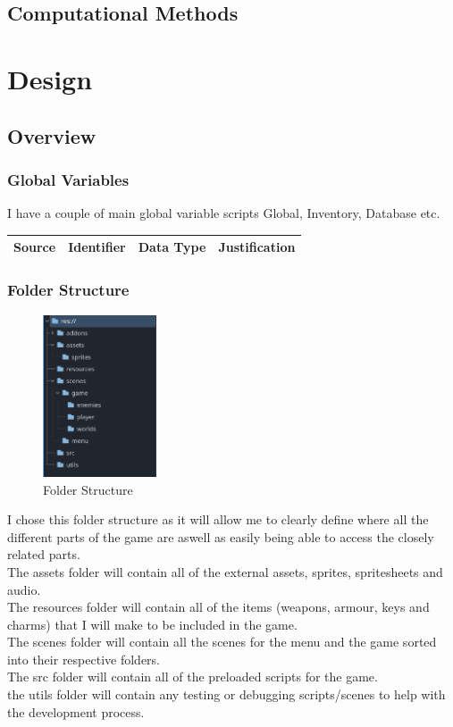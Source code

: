 \documentclass{article}
\begin{document}
        \subsection{Computational Methods}
\newpage
\pagestyle{plain}
\section{Design}
        \subsection{Overview}
        \subsubsection{Global Variables}
        I have a couple of main global variable scripts Global, Inventory, Database etc.\\
        \begin{tabular}{|c|c|c|c|}
                \hline
                Source&Identifier&Data Type&Justification\\
                \hline
        \end{tabular}
        \subsubsection{Folder Structure}
        \begin{figure}[H]
                \centering
                \includegraphics[width = 0.3\textwidth]{images/design/File_System.PNG}
                \caption{Folder Structure}
        \end{figure}
        I chose this folder structure as it will allow me to clearly define where all the different parts of the game are aswell as easily being able to access the closely related parts.\\
        The assets folder will contain all of the external assets, sprites, spritesheets and audio.\\
        The resources folder will contain all of the items (weapons, armour, keys and charms) that I will make to be included in the game.\\
        The scenes folder will contain all the scenes for the menu and the game sorted into their respective folders.\\
        The src folder will contain all of the preloaded scripts for the game.\\
        the utils folder will contain any testing or debugging scripts/scenes to help with the development process.\\
\end{document}
